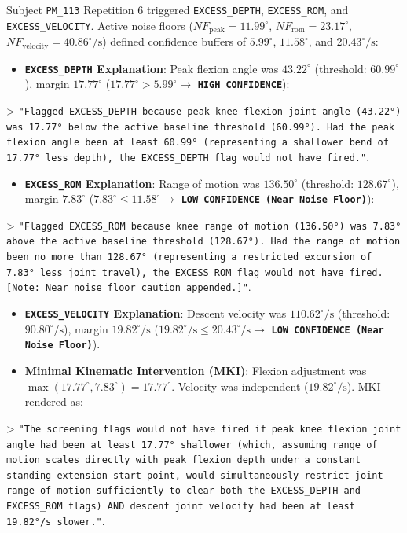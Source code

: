Subject \texttt{PM\_113} Repetition 6 triggered \texttt{EXCESS\_DEPTH}, \texttt{EXCESS\_ROM}, and \texttt{EXCESS\_VELOCITY}. Active noise floors ($NF_{\text{peak}} = 11.99^\circ$, $NF_{\text{rom}} = 23.17^\circ$, $NF_{\text{velocity}} = 40.86^\circ/\text{s}$) defined confidence buffers of $5.99^\circ$, $11.58^\circ$, and $20.43^\circ/\text{s}$:
\begin{itemize}
  \item \textbf{\texttt{EXCESS\_DEPTH} Explanation}: Peak flexion angle was $43.22^\circ$ (threshold: $60.99^\circ$), margin \textbf{$17.77^\circ$} ($17.77^\circ > 5.99^\circ \rightarrow$ \textbf{\texttt{HIGH CONFIDENCE}}):
\end{itemize}
> \texttt{"Flagged EXCESS\_DEPTH because peak knee flexion joint angle (43.22°) was 17.77° below the active baseline threshold (60.99°). Had the peak flexion angle been at least 60.99° (representing a shallower bend of 17.77° less depth), the EXCESS\_DEPTH flag would not have fired."}.
\begin{itemize}
  \item \textbf{\texttt{EXCESS\_ROM} Explanation}: Range of motion was $136.50^\circ$ (threshold: $128.67^\circ$), margin \textbf{$7.83^\circ$} ($7.83^\circ \le 11.58^\circ \rightarrow$ \textbf{\texttt{LOW CONFIDENCE (Near Noise Floor)}}):
\end{itemize}
> \texttt{"Flagged EXCESS\_ROM because knee range of motion (136.50°) was 7.83° above the active baseline threshold (128.67°). Had the range of motion been no more than 128.67° (representing a restricted excursion of 7.83° less joint travel), the EXCESS\_ROM flag would not have fired. [Note: Near noise floor caution appended.]"}.
\begin{itemize}
  \item \textbf{\texttt{EXCESS\_VELOCITY} Explanation}: Descent velocity was $110.62^\circ/\text{s}$ (threshold: $90.80^\circ/\text{s}$), margin \textbf{$19.82^\circ/\text{s}$} ($19.82^\circ/\text{s} \le 20.43^\circ/\text{s} \rightarrow$ \textbf{\texttt{LOW CONFIDENCE (Near Noise Floor)}}).
  \item \textbf{Minimal Kinematic Intervention (MKI)}: Flexion adjustment was $\max(17.77^\circ, 7.83^\circ) = 17.77^\circ$. Velocity was independent ($19.82^\circ/\text{s}$). MKI rendered as:
\end{itemize}
> \texttt{"The screening flags would not have fired if peak knee flexion joint angle had been at least 17.77° shallower (which, assuming range of motion scales directly with peak flexion depth under a constant standing extension start point, would simultaneously restrict joint range of motion sufficiently to clear both the EXCESS\_DEPTH and EXCESS\_ROM flags) AND descent joint velocity had been at least 19.82°/s slower."}.

